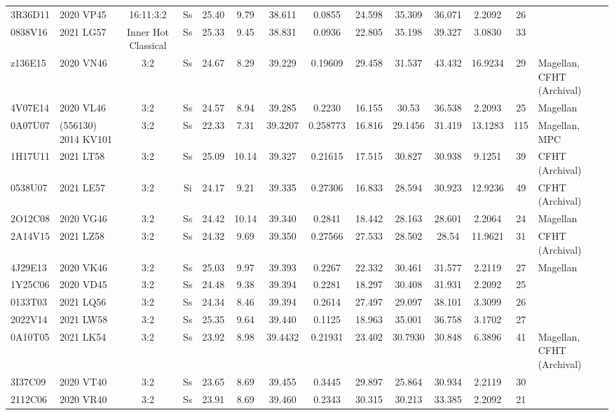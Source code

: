 \begin{longrotatetable}
\begin{longtable}{ll|ccccccccccc | l}
3R36D11 & 2020 VP45 & 16:11:3:2 & Ss & 25.40 & 9.79 & 38.611 & 0.0855 & 24.598 & 35.309 & 36.071 & 2.2092 & 26 & \\ 
0838V16 & 2021 LG57 & Inner Hot Classical & Ss & 25.33 & 9.45 & 38.831 & 0.0936 & 22.805 & 35.198 & 39.327 & 3.0830 & 33 & \\ 
z136E15 & 2020 VN46 & 3:2 & Ss & 24.67 & 8.29 & 39.229 & 0.19609 & 29.458 & 31.537 & 43.432 & 16.9234 & 29 & Magellan, CFHT (Archival)  \\ 
4V07E14 & 2020 VL46 & 3:2 & Ss & 24.57 & 8.94 & 39.285 & 0.2230 & 16.155 & 30.53 & 36.538 & 2.2093 & 25 & Magellan  \\ 
0A07U07 & (556130) 2014 KV101 & 3:2 & Ss & 22.33 & 7.31 & 39.3207 & 0.258773 & 16.816 & 29.1456 & 31.419 & 13.1283 & 115 & Magellan, MPC  \\ 
1H17U11 & 2021 LT58 & 3:2 & Ss & 25.09 & 10.14 & 39.327 & 0.21615 & 17.515 & 30.827 & 30.938 & 9.1251 & 39 & CFHT (Archival)  \\ 
0538U07 & 2021 LE57 & 3:2 & Si & 24.17 & 9.21 & 39.335 & 0.27306 & 16.833 & 28.594 & 30.923 & 12.9236 & 49 & CFHT (Archival)  \\ 
2O12C08 & 2020 VG46 & 3:2 & Ss & 24.42 & 10.14 & 39.340 & 0.2841 & 18.442 & 28.163 & 28.601 & 2.2064 & 24 & Magellan  \\ 
2A14V15 & 2021 LZ58 & 3:2 & Ss & 24.32 & 9.69 & 39.350 & 0.27566 & 27.533 & 28.502 & 28.54 & 11.9621 & 31 & CFHT (Archival)  \\ 
4J29E13 & 2020 VK46 & 3:2 & Ss & 25.03 & 9.97 & 39.393 & 0.2267 & 22.332 & 30.461 & 31.577 & 2.2119 & 27 & Magellan  \\ 
1Y25C06 & 2020 VD45 & 3:2 & Ss & 24.48 & 9.38 & 39.394 & 0.2281 & 18.297 & 30.408 & 31.931 & 2.2092 & 25 & \\ 
0133T03 & 2021 LQ56 & 3:2 & Ss & 24.34 & 8.46 & 39.394 & 0.2614 & 27.497 & 29.097 & 38.101 & 3.3099 & 26 & \\ 
2022V14 & 2021 LW58 & 3:2 & Ss & 25.35 & 9.64 & 39.440 & 0.1125 & 18.963 & 35.001 & 36.758 & 3.1702 & 27 & \\ 
0A10T05 & 2021 LK54 & 3:2 & Ss & 23.92 & 8.98 & 39.4432 & 0.21931 & 23.402 & 30.7930 & 30.848 & 6.3896 & 41 & Magellan, CFHT (Archival)  \\ 
3I37C09 & 2020 VT40 & 3:2 & Ss & 23.65 & 8.69 & 39.455 & 0.3445 & 29.897 & 25.864 & 30.934 & 2.2119 & 30 & \\ 
2112C06 & 2020 VR40 & 3:2 & Ss & 23.91 & 8.69 & 39.460 & 0.2343 & 30.315 & 30.213 & 33.385 & 2.2092 & 21 & \\ 

\end{longtable}
\end{longrotatetable}
